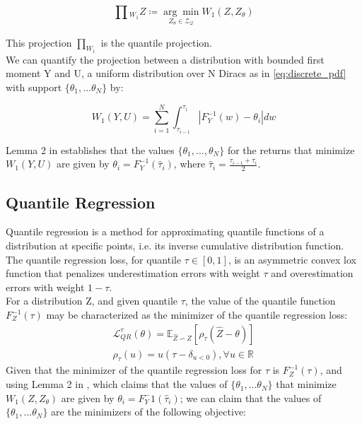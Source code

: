 \begin{equation}
    \prod{}_{W_1} Z \coloneqq  \underset{Z_\theta \in \mathcal{Z_Q}}{\arg \min } W_1(Z,Z_\theta)
\end{equation}

This projection $\prod_ {W_1}$ is the quantile projection.\\
We can quantify the projection between a distribution with bounded first moment Y and U, a uniform distribution
over N Diracs as in \eqref{eq:discrete_pdf} with support $\{\theta_1, ... \theta_N\}$ by:

\begin{equation}
    W_1(Y,U)= \sum_{i=1}^{N}\int_{\tau_{i-1}}^{\tau_i} |   F_Y^{-1}(w)-\theta_i   |dw
\end{equation}

Lemma 2 in \cite{Dabney2018a} establishes that the values $\{\theta_1, ... ,\theta_N\}$ for the returns  that minimize 
$W_1(Y,U)$ are given by $\theta_i = F_Y^{-1}(\hat\tau_i)$, where $\hat\tau_i=\frac{\tau_{i-1}+\tau_i}{2}$.

\subsection{Quantile Regression}
Quantile regression is a method for approximating quantile functions of a distribution at specific points, i.e. its inverse
cumulative distribution function.
The quantile regression loss, for quantile $\tau \in [0,1]$, is an asymmetric convex lox function
that penalizes underestimation errors with weight $\tau$ and overestimation errors
with weight $1-\tau$. \\
For a distribution Z, and given quantile $\tau$, the value of the quantile function $F_Z^{-1}(\tau)$
may be characterized as the minimizer of the quantile regression loss:
\begin{align}
    \mathcal{L}_{QR}^{\tau}(\theta)=\mathbb E_{\hat{Z}\backsim Z}[\rho_\tau(\hat{Z}-\theta) ] \label{eq:quantile_loss}\\
    \rho_\tau(u)=u(\tau - \delta_{u<0}) , \forall u \in \mathbb{R} \nonumber
\end{align}
Given that the minimizer of the quantile regression loss for $\tau$ is $F_Z^{-1}(\tau)$, and using Lemma 2 in \cite{Dabney2018a},
which claims that the values of $\{\theta_1, ... \theta_N\}$ that minimize
 $W_1(Z,Z_\theta)$ are given by $\theta_i = F_Y^-1(\hat\tau_i)$; we can claim that
 the values of $\{\theta_1, ... \theta_N\}$ are the minimizers of the following objective:

